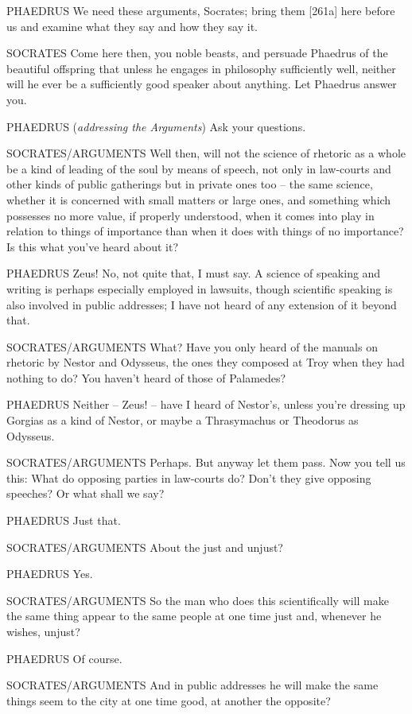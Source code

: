 PHAEDRUS We need these arguments, Socrates; bring them {[}261a{]} here
before us and examine what they say and how they say it.

SOCRATES Come here then, you noble beasts, and persuade Phaedrus of the
beautiful offspring that
unless he engages in philosophy sufficiently well, neither will he ever
be a sufficiently  good speaker about anything. Let Phaedrus
answer you.

PHAEDRUS ({\em addressing the Arguments}) Ask your questions.

SOCRATES/ARGUMENTS Well then, will not the science of rhetoric as a
whole be a kind of leading of the soul by means of
speech, not only in
law-courts and other kinds of public gatherings but in private ones too
-- the same science, whether  it is concerned with small matters
or large ones, and something which possesses no more value, if properly
understood, when it comes into play in relation to things of importance
than when it does with things of no importance? Is this what you've
heard about it?

PHAEDRUS Zeus! No, not quite that, I must say. A science of 
speaking and writing is perhaps especially employed in lawsuits, though
scientific speaking is also involved in public addresses; I have not
heard of any extension of it beyond that.

SOCRATES/ARGUMENTS What? Have you only heard of the manuals on rhetoric
by Nestor and Odysseus, the ones they composed at Troy when they had
nothing to do? You haven't heard of those of
Palamedes?

 PHAEDRUS Neither -- Zeus! -- have I heard of Nestor's, unless
you're dressing up Gorgias as a kind of Nestor, or maybe a Thrasymachus
or Theodorus as
Odysseus.

SOCRATES/ARGUMENTS Perhaps. But anyway let them pass.  Now you
tell us this: What do opposing parties in law-courts do? Don't they give
opposing speeches? Or what shall we say?

PHAEDRUS Just that.

SOCRATES/ARGUMENTS About the just and unjust?

PHAEDRUS Yes.

 SOCRATES/ARGUMENTS So the man who does this scientifically
 will make the same thing appear to the same people at one time
just and, whenever he wishes, unjust?

PHAEDRUS Of course.

SOCRATES/ARGUMENTS And in public addresses he will make the same things
seem to the city at one time good, at another the
opposite?

